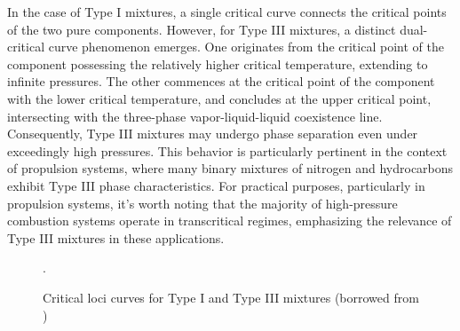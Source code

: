 In the case of Type I mixtures, a single critical curve connects the critical points of the two pure components. However, for Type III mixtures, a distinct dual-critical curve phenomenon emerges. One originates from the critical point of the component possessing the relatively higher critical temperature, extending to infinite pressures. The other commences at the critical point of the component with the lower critical temperature, and concludes at the upper critical point, intersecting with the three-phase vapor-liquid-liquid coexistence line. Consequently, Type III mixtures may undergo phase separation even under exceedingly high pressures. This behavior is particularly pertinent in the context of propulsion systems, where many binary mixtures of nitrogen and hydrocarbons exhibit Type III phase characteristics. For practical purposes, particularly in propulsion systems, it's worth noting that the majority of high-pressure combustion systems operate in transcritical regimes, emphasizing the relevance of Type III mixtures in these applications.


\begin{figure}[htb]
    \centering
    \caption{Critical loci curves for Type I and Type III mixtures (borrowed from \cite{qiu2015investigation})} \label{Intro_critical_loci}. 
\end{figure}


